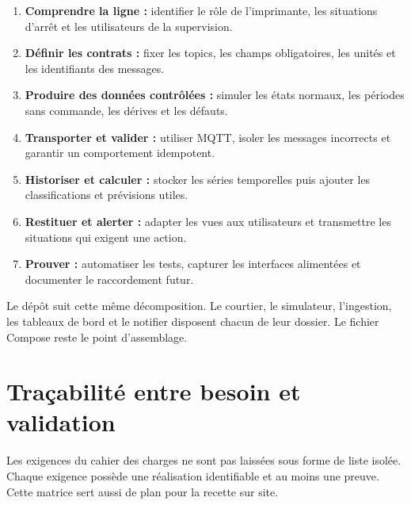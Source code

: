 \begin{enumerate}
  \item \textbf{Comprendre la ligne :} identifier le rôle de l'imprimante, les
        situations d'arrêt et les utilisateurs de la supervision.
  \item \textbf{Définir les contrats :} fixer les topics, les champs obligatoires,
        les unités et les identifiants des messages.
  \item \textbf{Produire des données contrôlées :} simuler les états normaux,
        les périodes sans commande, les dérives et les défauts.
  \item \textbf{Transporter et valider :} utiliser MQTT, isoler les messages
        incorrects et garantir un comportement idempotent.
  \item \textbf{Historiser et calculer :} stocker les séries temporelles puis
        ajouter les classifications et prévisions utiles.
  \item \textbf{Restituer et alerter :} adapter les vues aux utilisateurs et
        transmettre les situations qui exigent une action.
  \item \textbf{Prouver :} automatiser les tests, capturer les interfaces
        alimentées et documenter le raccordement futur.
\end{enumerate}

Le dépôt suit cette même décomposition. Le courtier, le simulateur,
l'ingestion, les tableaux de bord et le notifier disposent chacun de leur
dossier. Le fichier Compose reste le point d'assemblage.

\section{Traçabilité entre besoin et validation}

Les exigences du cahier des charges ne sont pas laissées sous forme de liste
isolée. Chaque exigence possède une réalisation identifiable et au moins une
preuve. Cette matrice sert aussi de plan pour la recette sur site.

